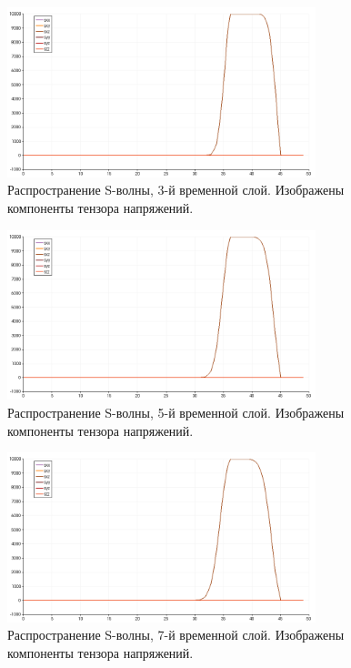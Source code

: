 \begin{figure}[htp]
\centering
\includegraphics[width=0.8\textwidth]{png/s-wave-test/s/0003.png}
\caption{Распространение S-волны, 3-й временной слой. Изображены компоненты тензора напряжений.}
\end{figure}

\begin{figure}[htp]
\centering
\includegraphics[width=0.8\textwidth]{png/s-wave-test/s/0005.png}
\caption{Распространение S-волны, 5-й временной слой. Изображены компоненты тензора напряжений.}
\end{figure}

\begin{figure}[htp]
\centering
\includegraphics[width=0.8\textwidth]{png/s-wave-test/s/0007.png}
\caption{Распространение S-волны, 7-й временной слой. Изображены компоненты тензора напряжений.}
\end{figure}

